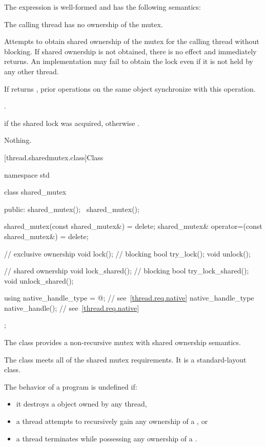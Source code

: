 \pnum
The expression  is well-formed and has the following semantics:
\begin{itemdescr}
\pnum
\expects
The calling thread has no ownership of the mutex.

\pnum
\effects
Attempts to obtain shared ownership of the mutex for the calling
thread without blocking. If shared ownership is not obtained, there is no
effect and  immediately returns. An implementation
may fail to obtain the lock even if it is not held by any other thread.

\pnum
\sync
If  returns , prior 
operations on the same object synchronize with this
operation.

\pnum
\returntype {}.

\pnum
\returns
{} if the shared lock was acquired, otherwise .

\pnum
\throws
Nothing.
\end{itemdescr}

[thread.sharedmutex.class]{Class }

%
\begin{codeblock}
namespace std {
  class shared_mutex {
  public:
    shared_mutex();
    ~shared_mutex();

    shared_mutex(const shared_mutex&) = delete;
    shared_mutex& operator=(const shared_mutex&) = delete;

    // exclusive ownership
    void lock();                // blocking
    bool try_lock();
    void unlock();

    // shared ownership
    void lock_shared();         // blocking
    bool try_lock_shared();
    void unlock_shared();

    using native_handle_type = @\impdefnc@;          // see~\ref{thread.req.native}
    native_handle_type native_handle();                         // see~\ref{thread.req.native}
  };
}
\end{codeblock}

\pnum
The class  provides a non-recursive mutex
with shared ownership semantics.

\pnum
The class  meets
all of the shared mutex requirements.
It is a standard-layout class.

\pnum
The behavior of a program is undefined if:
\begin{itemize}
\item it destroys a  object owned by any thread,
\item a thread attempts to recursively gain any ownership of a , or
\item a thread terminates while possessing any ownership of a .
\end{itemize}

